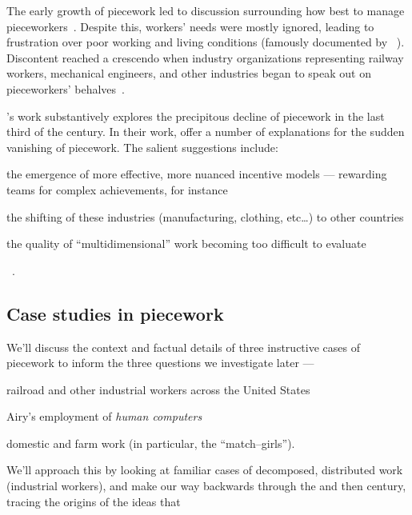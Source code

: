 \documentclass[trackingWork]{subfiles}
\begin{document}
The early growth of piecework led to discussion surrounding how best to manage pieceworkers~\cite{norton1900textile,clark1908cotton}.
Despite this, workers' needs were mostly ignored,
leading to frustration over poor working and living conditions
(famously documented by
\citeauthor{riisOtherSideLives}~\cite{riisOtherSideLives}).
Discontent reached a crescendo when industry organizations representing
railway workers, mechanical engineers, and other industries began to speak out on pieceworkers' behalves~\cite{american1921problem,richards1904anything}.

\citeauthor{hart2013rise}'s work substantively explores the precipitous decline of piecework in the last third of the  century.
In their work, \citeauthor{hart2013rise} offer a number of explanations for the sudden vanishing of piecework.
The salient suggestions include:
\begin{inlinelist}[itemjoin*={;~and~},itemjoin={;~}]
\item the emergence of more effective, more nuanced incentive models
--- rewarding teams for complex achievements, for instance
\item the shifting of these industries (manufacturing, clothing, etc\dots)
to other countries
\item the quality of ``multidimensional'' work becoming too difficult to evaluate
\end{inlinelist}~\cite{hart2013rise}.







\subsection{Case studies in piecework}
We'll discuss the context and factual details of three instructive cases of piecework to inform the three questions we investigate later ---
\begin{numberlist}[itemjoin*={;~and~},itemjoin={;~}]
  \item railroad and other industrial workers across the United States
  \item Airy's employment of \textit{human computers}
  \item domestic and farm work (in particular, the ``match--girls'').
\end{numberlist}
We'll approach this by looking at familiar cases of decomposed, distributed work (industrial workers),
and make our way backwards through the  and then  century,
tracing the origins of the ideas that 
\end{document}
